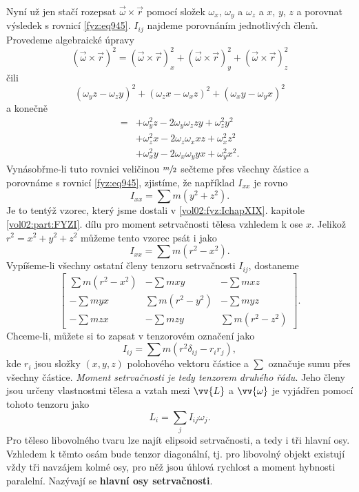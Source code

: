     Nyní už jen stačí rozepsat \(\vec{ω}\times\vec{r}\) pomocí složek \(ω_x\), \(ω_y\) a \(ω_z\) a
    \(x\), \(y\), \(z\) a porovnat výsledek s rovnicí \eqref{fyz:eq945}. \(I_{ij}\) najdeme
    porovnáním jednotlivých členů. Provedeme algebraické úpravy
    \begin{equation*}
      (\vec{ω}×\vec{r})^2=(\vec{ω}×\vec{r})^2_x+(\vec{ω}×\vec{r})^2_y+(\vec{ω}×\vec{r})^2_z
    \end{equation*}
    čili
    \begin{equation*}
      (ω_yz−ω_zy)^2+(ω_zx−ω_xz)^2+(ω_xy−ω_yx)^2
    \end{equation*}
    a konečně
    \begin{align*}
      = &+ω_y^2z − 2ω_yω_z zy + ω_z^2y^2 \\
        &+ω_z^2x − 2ω_zω_x xz + ω_x^2z^2 \\
        &+ω_x^2y − 2ω_xω_y yx + ω_y^2x^2.
    \end{align*}
    Vynásobřme-li tuto rovnici veličinou \(\sfrac{m}{2}\) sečteme přes všechny částice a porovnáme s
    rovnicí \eqref{fyz:eq945}, zjistíme, že například \(I_{xx}\) je rovno
    \begin{equation*}
      I_{xx}=∑m(y^2+z^2).
    \end{equation*}
    Je to tentýž vzorec, který jsme dostali v \ref{vol02:fyz:IchapXIX}. kapitole
    \ref{vol02:part:FYZI}. dílu pro moment setrvačnosti tělesa vzhledem k ose \(x\). Jelikož \(r^2 =
    x^2 + y^2 + z^2\) můžeme tento vzorec psát i jako
    \begin{equation*}
      I_{xx}=∑m(r^2-x^2).
    \end{equation*}
    Vypíšeme-li všechny ostatní členy tenzoru setrvačnosti \(I_{ij}\), dostaneme
    \begin{equation*}
      \begin{bmatrix}
        \sum m(r^2-x^2) &    -\sum mxy     &   -\sum mxz     \\
          -\sum myx     &  \sum m(r^2-y^2) &   -\sum myz     \\
          -\sum mzx     &    -\sum mzy     & \sum m(r^2-z^2)
      \end{bmatrix}.
    \end{equation*}
    Chceme-li, můžete si to zapsat v tenzorovém označení jako
    \begin{equation}\label{fyz:eq949}
      I_{ij}=\sum m(r^2\delta_{ij}-r_ir_j),
    \end{equation}
    kde \(r_i\) jsou složky \((x, y, z)\) polohového vektoru částice a \(\sum\) označuje sumu přes
    všechny částice. \emph{Moment setrvačnosti je tedy tenzorem druhého řádu}. Jeho členy jsou
    určeny vlastnostmi tělesa a vztah mezi \(\vv{L}\) a \(\vv{\omega}\) je vyjádřen pomocí tohoto
    tenzoru jako
    \begin{equation}\label{fyz:eq950}
      L_i=\sum_jI_{ij}\omega_j.
    \end{equation}
    Pro těleso libovolného tvaru lze najít elipsoid setrvačnosti, a tedy i tři hlavní osy. Vzhledem
    k těmto osám bude tenzor diagonální, tj. pro libovolný objekt existují vždy tři navzájem kolmé
    osy, pro něž jsou úhlová rychlost a moment hybnosti paralelní. Nazývají se \textbf{hlavní osy
    setrvačnosti}.

